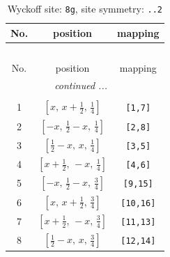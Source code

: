 \documentclass[fleqn,8pt]{jsarticle}
\begin{document}
\renewcommand{\arraystretch}{1.2}
\begin{longtable}{ccc}
\caption{Wyckoff site: {\tt 8g}, site symmetry: {\tt ..2}}
 \\
 \hline \hline
No. & position & mapping \\ \hline \endfirsthead

\multicolumn{2}{l}{\tablename\ \thetable{}} \\
 \hline \hline
No. & position & mapping \\ \hline \endhead

 \hline \hline
\multicolumn{2}{r}{\footnotesize\it continued ...} \\ \endfoot

 \hline \hline
\multicolumn{2}{r}{} \\ \endlastfoot

1 & $\left[ x,\, x + \frac{1}{2},\, \frac{1}{4} \right]$ & {\tt [1,7]} \\ \hline
2 & $\left[ - x,\, \frac{1}{2} - x,\, \frac{1}{4} \right]$ & {\tt [2,8]} \\ \hline
3 & $\left[ \frac{1}{2} - x,\, x,\, \frac{1}{4} \right]$ & {\tt [3,5]} \\ \hline
4 & $\left[ x + \frac{1}{2},\, - x,\, \frac{1}{4} \right]$ & {\tt [4,6]} \\ \hline
5 & $\left[ - x,\, \frac{1}{2} - x,\, \frac{3}{4} \right]$ & {\tt [9,15]} \\ \hline
6 & $\left[ x,\, x + \frac{1}{2},\, \frac{3}{4} \right]$ & {\tt [10,16]} \\ \hline
7 & $\left[ x + \frac{1}{2},\, - x,\, \frac{3}{4} \right]$ & {\tt [11,13]} \\ \hline
8 & $\left[ \frac{1}{2} - x,\, x,\, \frac{3}{4} \right]$ & {\tt [12,14]} \\
\end{longtable}
\renewcommand{\arraystretch}{1.2}
\end{document}
